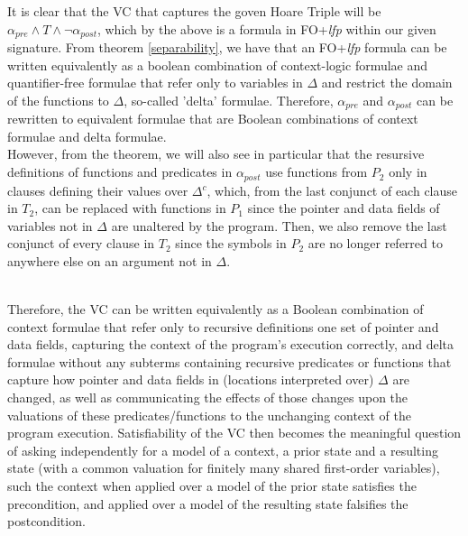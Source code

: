 It is clear that the VC that captures the goven Hoare Triple will be $\alpha_{pre} \land{} T \land{} \neg{} \alpha_{post}$, which by the above is a formula in FO+\textit{lfp} within our given signature. From theorem \ref{separability}, we have that an FO+\textit{lfp} formula can be written equivalently as a boolean combination of context-logic formulae and quantifier-free formulae that refer only to variables in $\Delta$ and restrict the domain of the functions to $\Delta$, so-called 'delta' formulae. Therefore, $\alpha_{pre}$ and $\alpha_{post}$ can be rewritten to equivalent formulae that are Boolean combinations of context formulae and delta formulae.\\
However, from the theorem, we will also see in particular that the resursive definitions of functions and predicates in $\alpha_{post}$ use functions from $P_2$ only in clauses defining their values over $\Delta{}^{c}$, which, from the last conjunct of each clause in $T_2$, can be replaced with functions in $P_1$ since the pointer and data fields of variables not in $\Delta$ are unaltered by the program. Then, we also remove the last conjunct of every clause in $T_2$ since the symbols in $P_2$ are no longer referred to anywhere else on an argument not in $\Delta{}$.\\\

Therefore, the VC can be written equivalently as a Boolean combination of context formulae that refer only to recursive definitions one set of pointer and data fields, capturing the context of the program's execution correctly, and delta formulae without any subterms containing recursive predicates or functions that capture how pointer and data fields in (locations interpreted over) $\Delta$ are changed, as well as communicating the effects of those changes upon the valuations of these predicates/functions to the unchanging context of the program execution. Satisfiability of the VC then becomes the meaningful question of asking independently for a model of a context, a prior state and a resulting state (with a common valuation for finitely many shared first-order variables), such the context when applied over a model of the prior state satisfies the precondition, and applied over a model of the resulting state falsifies the postcondition. 